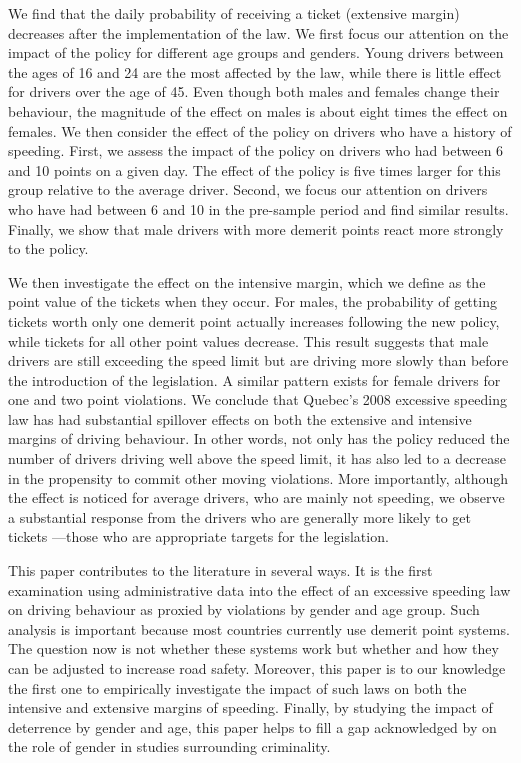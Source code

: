 We find that the daily probability of receiving a ticket (extensive margin) 
decreases after the implementation of the law. We first focus our attention on the impact of the policy for different age groups and genders.
Young drivers between the ages of 16 and 24 are the most affected by the law, 
while there is little effect for drivers over the age of 45. 
Even though both males and females change their behaviour, the magnitude of the effect on males is about eight times the effect on females. 
We then consider the effect of the policy on drivers who have a history of speeding. First, we assess the impact of the policy on drivers who had between 6 and 10 points on a given day. The effect of the policy is five times larger for this group relative to the average driver. Second, we focus our attention on drivers who have had between 6 and 10 in the pre-sample period and find similar results. Finally, we show that male drivers with more demerit points react more strongly to the policy.

We then investigate the effect on the intensive margin, which we define as the point value of the tickets when they occur. 
For males, the probability of getting tickets worth only one demerit point 
actually increases following the new policy, while tickets for all other point values decrease. 
This result suggests that male drivers are still exceeding the speed limit 
but are driving more slowly than before the introduction of the legislation. 
A similar pattern exists for female drivers for one and two point violations. 
%
We conclude that Quebec’s 2008 excessive speeding law has had substantial spillover effects 
on both the extensive and intensive margins of driving behaviour. 
In other words, not only has the policy reduced the number of drivers driving well above the speed limit, 
it has also led to a decrease in the propensity to commit other moving violations.
% 
More importantly, although the effect is noticed for average drivers, 
who are mainly not speeding, 
we observe a substantial response from the drivers who are generally more likely to get tickets%
---those who are appropriate targets for the legislation. 

This paper contributes to the literature in several ways. 
It is the first examination using administrative data into the effect of 
an excessive speeding law on driving behaviour 
as proxied by violations by gender and age group. 
Such analysis is important because most countries currently use demerit point systems. 
The question now is not whether these systems work 
but whether and how they can be adjusted to increase road safety. 
Moreover, this paper is to our knowledge the first one to empirically investigate 
the impact of such laws on both the intensive and extensive margins of speeding. 
Finally, by studying the impact of deterrence by gender and age, 
this paper helps to fill a gap acknowledged by 
\citet{freeman1999}
on the role of gender in studies surrounding criminality.


